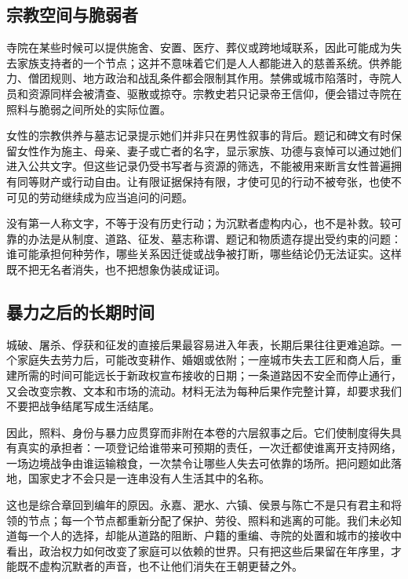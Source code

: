 \subsection{宗教空间与脆弱者}

寺院在某些时候可以提供施舍、安置、医疗、葬仪或跨地域联系，因此可能成为失去家族支持者的一个节点；这并不意味着它们是人人都能进入的慈善系统。供养能力、僧团规则、地方政治和战乱条件都会限制其作用。禁佛或城市陷落时，寺院人员和资源同样会被清查、驱散或掠夺。宗教史若只记录帝王信仰，便会错过寺院在照料与脆弱之间所处的实际位置。

女性的宗教供养与墓志记录提示她们并非只在男性叙事的背后。题记和碑文有时保留女性作为施主、母亲、妻子或亡者的名字，显示家族、功德与哀悼可以通过她们进入公共文字。但这些记录仍受书写者与资源的筛选，不能被用来断言女性普遍拥有同等财产或行动自由。让有限证据保持有限，才使可见的行动不被夸张，也使不可见的劳动继续成为应当追问的问题。

\begin{debate}[怎样写没有自述的人]
没有第一人称文字，不等于没有历史行动；为沉默者虚构内心，也不是补救。较可靠的办法是从制度、道路、征发、墓志称谓、题记和物质遗存提出受约束的问题：谁可能承担何种劳作，哪些关系因迁徙或战争被打断，哪些结论仍无法证实。这样既不把无名者消失，也不把想象伪装成证词。
\end{debate}

\subsection{暴力之后的长期时间}

城破、屠杀、俘获和征发的直接后果最容易进入年表，长期后果往往更难追踪。一个家庭失去劳力后，可能改变耕作、婚姻或依附；一座城市失去工匠和商人后，重建所需的时间可能远长于新政权宣布接收的日期；一条道路因不安全而停止通行，又会改变宗教、文本和市场的流动。材料无法为每种后果作完整计算，却要求我们不要把战争结尾写成生活结尾。

因此，照料、身份与暴力应贯穿而非附在本卷的六层叙事之后。它们使制度得失具有真实的承担者：一项登记给谁带来可预期的责任，一次迁都使谁离开支持网络，一场边境战争由谁运输粮食，一次禁令让哪些人失去可依靠的场所。把问题如此落地，国家史才不会只是一连串没有人生活其中的名称。

这也是综合章回到编年的原因。永嘉、淝水、六镇、侯景与陈亡不是只有君主和将领的节点；每一个节点都重新分配了保护、劳役、照料和逃离的可能。我们未必知道每一个人的选择，却能从道路的阻断、户籍的重编、寺院的处置和城市的接收中看出，政治权力如何改变了家庭可以依赖的世界。只有把这些后果留在年序里，才能既不虚构沉默者的声音，也不让他们消失在王朝更替之外。
